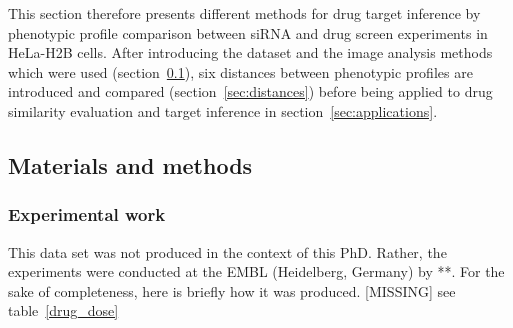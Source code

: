 This section therefore presents different methods for drug target inference by phenotypic profile comparison between siRNA and drug screen experiments in HeLa-H2B cells. After introducing the dataset and the image analysis methods which were used (section~\ref{sec:math_methods_ds}), six distances between phenotypic profiles are introduced and compared (section~\ref{sec:distances}) before being applied to drug similarity evaluation and target inference in section~\ref{sec:applications}.

\subsection{Materials and methods}
\label{sec:math_methods_ds}
\subsubsection{Experimental work}
This data set was not produced in the context of this PhD. Rather, the experiments were conducted at the EMBL (Heidelberg, Germany) by **. For the sake of completeness, here is briefly how it was produced. [MISSING] see table~\ref{drug_dose}


